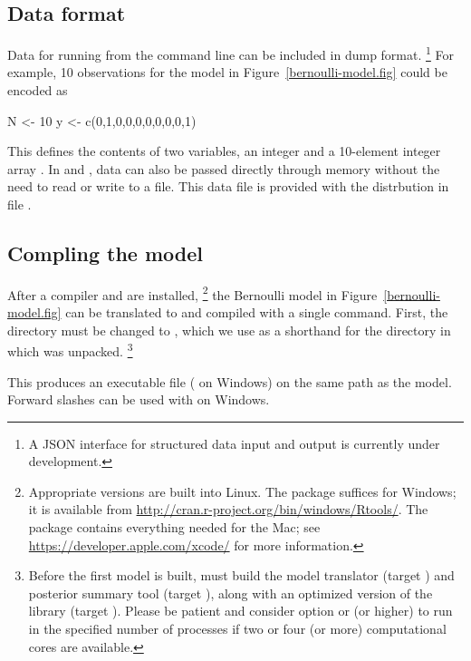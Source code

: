 \documentclass[article]{jss}
\begin{document}
\subsection{Data format}

Data for running  from the command line can be included
in  dump format.%
%
\footnote{A JSON interface for structured data input and output is
  currently under development.}
%
For example, 10 observations for the
model in Figure~\ref{bernoulli-model.fig} could be encoded as
%
\begin{Code}
N <- 10
y <- c(0,1,0,0,0,0,0,0,0,1)
\end{Code}
%
This defines the contents of two variables, an integer  and a
10-element integer array .  In  and ,
data can also be passed directly through memory without the need to
read or write to a file.  This data file is provided with the
 distrbution in file
.

\subsection{Compling the model}

After a  compiler and  are installed,%
%
\footnote{Appropriate versions are built into Linux. The 
  package suffices for Windows; it is available from
  \url{http://cran.r-project.org/bin/windows/Rtools/}.  The
   package contains everything needed for the Mac; see
  \url{https://developer.apple.com/xcode/} for more information.}
%
the Bernoulli model in Figure~\ref{bernoulli-model.fig} can be
translated to  and compiled with a single command.
First, the directory must be changed to , which we use as
a shorthand for the directory in which  was unpacked.%
%
\footnote{Before the first model is built,  must build the
  model translator (target ) and posterior summary tool
  (target ), along with an optimized version of the
   library (target ).  Please be patient
  and consider  option  or  (or higher)
  to run in the specified number of processes if two or four (or more)
  computational cores are available.}
%
\begin{CodeChunk}
\end{CodeChunk}
%
This produces an executable file 
( on Windows) on the same path as the model.
Forward slashes can be used with  on Windows.
\end{document}
